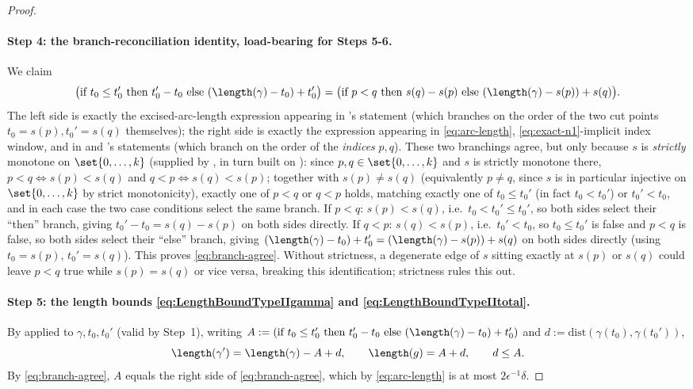 \begin{proof}
  \paragraph{Step 4: the branch-reconciliation identity, load-bearing for Steps 5-6.} We claim
  \begin{equation}
    \label{eq:branch-agree}
    \bigl(\text{if } t_0 \le t_0' \text{ then } t_0'-t_0 \text{ else } (\length(\gamma)-t_0)+t_0'
    \bigr)
    = \bigl(\text{if } p<q \text{ then } s(q)-s(p) \text{ else } (\length(\gamma)-s(p))+s(q)\bigr)
    .
  \end{equation}
  The left side is exactly the excised-arc-length expression appearing in 's
  statement (which branches on the order of the two cut points $t_0=s(p),t_0'=s(q)$ themselves);
  the right side is exactly the expression appearing in \eqref{eq:arc-length},
  \eqref{eq:exact-n1}-implicit index window, and in  and
  's statements (which branch on the order of the
  \emph{indices} $p,q$). These two branchings agree, but only because $s$ is \emph{strictly}
  monotone on $\set{0,\dots,k}$ (supplied by , in turn built
  on ): since $p,q\in\set{0,\dots,k}$ and $s$ is strictly
  monotone there, $p<q \iff s(p)<s(q)$ and $q<p \iff s(q)<s(p)$; together with $s(p)\ne s(q)$
  (equivalently $p\ne q$, since $s$ is in particular injective on $\set{0,\dots,k}$ by strict
  monotonicity), exactly one of $p<q$ or $q<p$ holds, matching exactly one of $t_0\le t_0'$ (in fact
  $t_0<t_0'$) or $t_0'<t_0$, and in each case the two case conditions select the same branch. If
  $p<q$: $s(p)<s(q)$, i.e.\ $t_0<t_0' \le t_0'$, so both sides select their ``then'' branch, giving
  $t_0'-t_0 = s(q)-s(p)$ on both sides directly. If $q<p$: $s(q)<s(p)$, i.e.\ $t_0'<t_0$, so
  $t_0\le t_0'$ is false and $p<q$ is false, so both sides select their ``else'' branch, giving
  $(\length(\gamma)-t_0)+t_0' = (\length(\gamma)-s(p))+s(q)$ on both sides directly (using
  $t_0=s(p)$, $t_0'=s(q)$). This proves \eqref{eq:branch-agree}. Without strictness, a degenerate
  edge of $s$ sitting exactly at $s(p)$ or $s(q)$ could leave $p<q$ true while $s(p)=s(q)$ or
  vice versa, breaking this identification; strictness rules this out.

  \paragraph{Step 5: the length bounds \eqref{eq:LengthBoundTypeIIgamma} and
  \eqref{eq:LengthBoundTypeIItotal}.} By  applied to $\gamma,t_0,t_0'$
  (valid by Step~1), writing $A := (\text{if } t_0\le t_0' \text{ then } t_0'-t_0 \text{ else }
  (\length(\gamma)-t_0)+t_0')$ and $d := \mathrm{dist}(\gamma(t_0),\gamma(t_0'))$,
  \[
    \length(\gamma') = \length(\gamma) - A + d
    , \qquad
    \length(g) = A + d
    , \qquad
    d \le A
    .
  \]
  By \eqref{eq:branch-agree}, $A$ equals the right side of \eqref{eq:branch-agree}, which by
  \eqref{eq:arc-length} is at most $2\epsilon^{-1}\delta$.


\end{proof}
